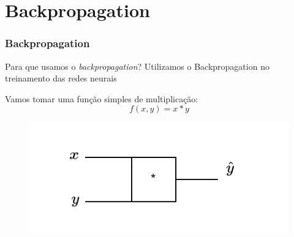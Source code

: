 \documentclass{beamer}
\begin{document}
\section{Backpropagation}
\begin{frame}
	\frametitle{Backpropagation}
	\begin{block}{Para que usamos o \textit{backpropagation}?}
		Utilizamos o Backpropagation no treinamento das redes neurais
	\end{block}
	\begin{example}
		Vamos tomar uma função simples de multiplicação:
		$$f(x, y) = x * y$$
			
		\begin{figure}
			\centering
			\includegraphics[width=0.5\linewidth]{figures/simple_multiply_gate}
		\end{figure}
	\end{example}
\end{frame}
\end{document}
